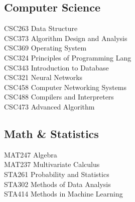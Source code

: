 \documentclass[]{deedy-resume-openfont}
\begin{document}
\begin{minipage}[t]{0.33\textwidth}
    \subsection{Computer Science}
    CSC263 Data Structure \\
    CSC373 Algorithm Design and Analysis  \\
    CSC369 Operating System \\
    CSC324 Principles of Programming Lang \\
    CSC343 Introduction to Database \\
    CSC321 Neural Networks \\
    CSC458 Computer Networking Systems \\
    CSC488 Compilers and Interpreters \\
    CSC473 Advanced Algorithm \\
    
    \sectionsep
    \subsection{Math \& Statistics}
    MAT247 Algebra  \\
    MAT237 Multivariate Calculus \\ 
    STA261 Probability and Statistics \\
    STA302 Methods of Data Analysis \\ 
    STA414 Methods in Machine Learning \\
    
    
    
    \end{minipage} 
    \hfill
\end{document}
